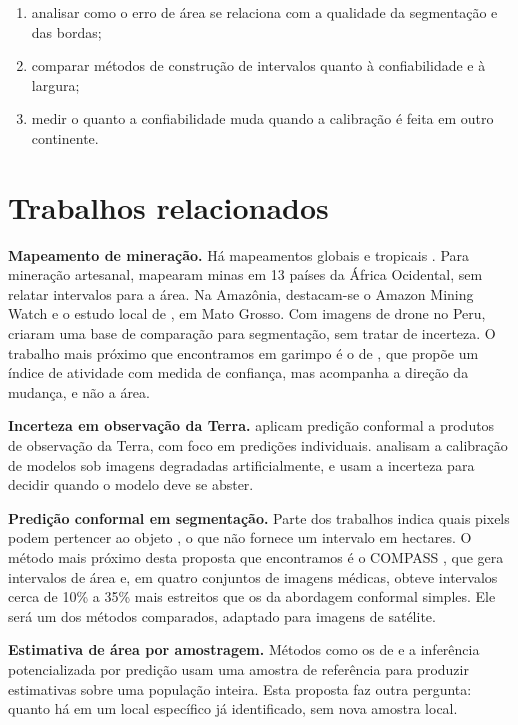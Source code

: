 \documentclass[11pt,a4paper]{article}
\begin{document}
\begin{enumerate}[leftmargin=*]
  \item analisar como o erro de área se relaciona com a qualidade da segmentação e das bordas;
  \item comparar métodos de construção de intervalos quanto à confiabilidade e à largura;
  \item medir o quanto a confiabilidade muda quando a calibração é feita em outro continente.
\end{enumerate}

\section{Trabalhos relacionados}

\textbf{Mapeamento de mineração.} Há mapeamentos globais \cite{tang2023} e tropicais \cite{jasansky2025}. Para mineração
artesanal, \cite{couttenier2022} mapearam minas em 13 países da África Ocidental, sem relatar intervalos para a área. Na
Amazônia, destacam-se o Amazon Mining Watch \cite{amw2026} e o estudo local de \cite{silva2025}, em Mato Grosso. Com
imagens de drone no Peru, \cite{cui2026} criaram uma base de comparação para segmentação, sem tratar de incerteza. O
trabalho mais próximo que encontramos em garimpo é o de \cite{okumura2026}, que propõe um índice de atividade com medida de confiança,
mas acompanha a direção da mudança, e não a área.

\textbf{Incerteza em observação da Terra.} \cite{singh2024} aplicam predição conformal a produtos de observação da
Terra, com foco em predições individuais. \cite{lehmann2026} analisam a calibração de modelos sob imagens
degradadas artificialmente, e \cite{gonzalez2026} usam a incerteza para decidir quando o modelo deve se abster.

\textbf{Predição conformal em segmentação.} Parte dos trabalhos indica quais pixels podem pertencer ao objeto
\cite{mossina2024,viti2026}, o que não fornece um intervalo em hectares. O método mais próximo desta proposta que encontramos é o
COMPASS \cite{cheung2026}, que gera intervalos de área e, em quatro conjuntos de imagens médicas, obteve intervalos
cerca de 10\% a 35\% mais estreitos que os da abordagem conformal simples. Ele será um dos métodos comparados, adaptado para imagens de satélite.

\textbf{Estimativa de área por amostragem.} Métodos como os de \cite{olofsson2014} e a inferência potencializada por
predição \cite{angelopoulos2023,lu2025} usam uma amostra de referência para produzir estimativas sobre uma população
inteira. Esta proposta faz outra pergunta: quanto há em um local específico já identificado, sem nova amostra local.
\end{document}
